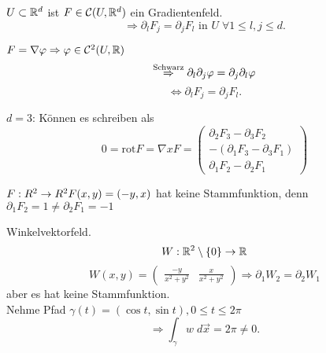\documentclass[../ana2.tex]{subfiles}
\begin{document}
\begin{satz}[Rotationsfreiheit]
    \( U \subset \mathbb{R}^d \) ist \( F \in \mathcal{C}(U, \mathbb{R}^d) \)
    ein Gradientenfeld.
    \[ \Rightarrow \partial_l F_j = \partial_j F_l \text{ in } U \;\forall 1 \leq l,j \leq d. \]
\end{satz}
\begin{bew}
    \( F = \nabla \varphi \Rightarrow \varphi \in \mathcal{C}^2(U, \mathbb{R}) \)
    \[ \overset{\text{Schwarz}}{\Rightarrow} \partial_l \partial_j \varphi = \partial_j \partial_l \varphi \]
    \[ \Leftrightarrow \partial_l F_j = \partial_j F_l. \]
\end{bew}
\( d = 3 \): Können es schreiben als 
\[ 0 = \mathrm{rot} F = \nabla x F  = \begin{pmatrix}
    \partial_2 F_3 - \partial_3 F_2 \\
    -(\partial_1 F_3 - \partial_3 F_1) \\
    \partial_1 F_2 - \partial_2 F_1 
\end{pmatrix} \]
\begin{bsp}
    \(F:R^2\rightarrow R^2  F(x,y) = (-y, x)\)
    hat keine Stammfunktion, denn \(\partial_1 F_2 = 1 \neq \partial_2 F_1 = -1\)
\end{bsp}
\begin{bsp}
    Winkelvektorfeld.
    \[ W:\mathbb{R}^2 \setminus \{0\}\rightarrow \mathbb{R} \]
    \[ W(x,y) = \begin{pmatrix}
        \frac{-y}{x^2 + y^2} & \frac{x}{x^2 + y^2}
    \end{pmatrix} \Rightarrow \partial_1 W_2 = \partial_2 W_1 \]
    aber es hat keine Stammfunktion.\\
    Nehme Pfad \( \gamma(t) = (\cos t, \sin t), 0 \leq t \leq 2\pi \)
    \[ \Rightarrow \int_\gamma w \; d\vec{x} = 2\pi \neq 0. \]
\end{bsp}
\end{document}

